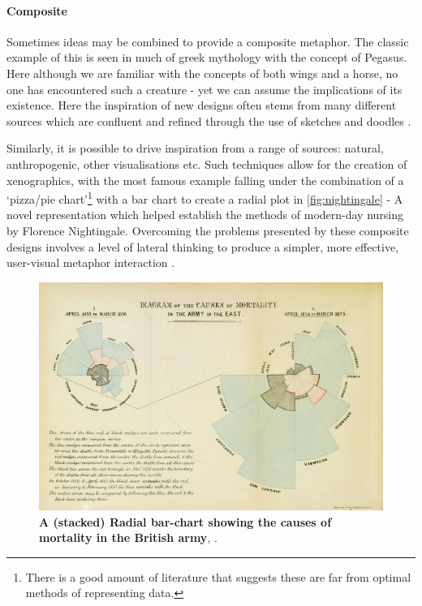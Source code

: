 \paragraph*{Composite}


Sometimes ideas may be combined to provide a composite metaphor. The classic example of this is seen in much of greek mythology with the concept of Pegasus. Here although we are familiar with the concepts of both wings and a horse, no one has encountered such a creature - yet we can assume the implications of its existence.
Here the inspiration of new designs often stems from many different sources which are confluent and refined through the use of sketches and doodles \citep{fds}. 

Similarly, it is possible to drive inspiration from a range of sources: natural, anthropogenic, other visualisations etc. 
Such techniques allow for the creation of xenographics, with the most famous example falling under the combination of a `pizza/pie chart'\footnote{There is a good amount of literature that suggests these are far from optimal methods of representing data. } with a bar chart to create a radial plot in \autoref{fig:nightingale} - A novel representation which helped establish the methods of modern-day nursing by Florence Nightingale. 
Overcoming the problems presented by these composite designs involves a level of lateral thinking to produce a simpler, more effective, user-visual metaphor interaction \citep{shapinginfo}. 



\begin{figure}[H]
     \centering
         \includegraphics[width=.75\textwidth]{figures_c1/nightingale.jpg}
        \caption[Caption for LOF]{\textbf{A (stacked) Radial bar-chart showing the causes of mortality in the British army}\protect\footnotemark , \citep{nightingale}.}
        \label{fig:nightingale}
\end{figure}





